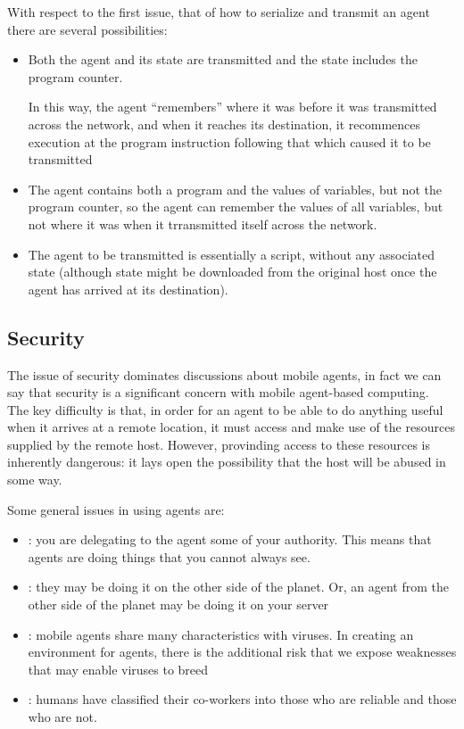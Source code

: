 With respect to the first issue, that of how to serialize and transmit an agent there are several possibilities:
\begin{itemize}
\item Both the agent and its state are transmitted and the state includes the program counter.

In this way, the agent ``remembers'' where it was before it was transmitted across the network, and when it reaches its destination, it recommences execution at the program instruction following that which caused it to be transmitted
\item The agent contains both a program and the values of variables, but not the program counter, so the agent can remember the values of all variables, but not where it was when it trransmitted itself across the network.
\item The agent to be transmitted is essentially a script, without any associated state (although state might be downloaded from  the original host once the agent has arrived at its destination).
\end{itemize}

\subsection{Security}
The issue of security dominates discussions about mobile agents, in fact we can say that security is a significant concern with mobile agent-based computing.\\
The key difficulty is that, in order for an agent to be able to do anything useful when it arrives at a remote location, it must access and make use of the resources supplied by the remote host. However, provinding access to these resources is inherently dangerous: it lays open the possibility that the host will be abused in some way.

Some general issues in using agents are:
\begin{itemize}
\item {}: you are delegating to the agent some of your authority. This means that agents are doing things that you cannot always see.
\item {}: they may be doing it on the other side of the planet. Or, an agent from the other side of the planet may be doing it on your server
\item {}: mobile agents share many characteristics with viruses. In creating an environment for agents, there is the additional risk that we expose weaknesses that may enable viruses to breed
\item {}: humans have classified their co-workers into those who are reliable and those who are not.
\end{itemize}

